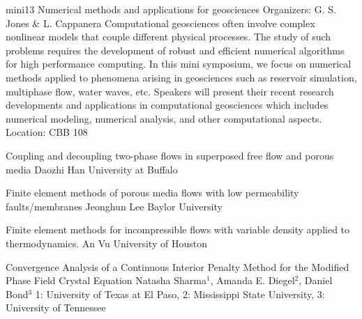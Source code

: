 \mini
{mini13}
{Numerical methods and applications for geosciences}
{Organizers: G. S. Jones \& L. Cappanera}
{Computational geosciences often involve complex nonlinear models that couple different physical processes. The study of such problems requires the development of robust and efficient numerical algorithms for high performance computing. In this mini symposium, we focus on numerical methods applied to phenomena arising in geosciences such as reservoir simulation, multiphase flow, water waves, etc. Speakers will present their recent research developments and applications in computational geosciences which includes numerical modeling, numerical analysis, and other computational aspects.}
{Location: CBB 108}

\begin{talks}
\item\talk
{Coupling and decoupling two-phase flows in superposed free flow and porous media}
{Daozhi Han}
{University at Buffalo}
\item\talk
{Finite element methods of porous media flows with low permeability faults/membranes}
{Jeonghun Lee}
{Baylor University}
\item\talk
{Finite element methods for incompressible flows with variable density applied to thermodynamics.}
{An Vu}
{University of Houston}
\item\talk
{Convergence Analysis of a Continuous Interior Penalty Method for the Modified Phase Field Crystal Equation}
{Natasha Sharma$^{1}$, Amanda E. Diegel$^{2}$, Daniel Bond$^{3}$}
{1: University of Texas at El Paso, 2: Mississippi State University, 3: University of Tennessee}
\end{talks}
\room
